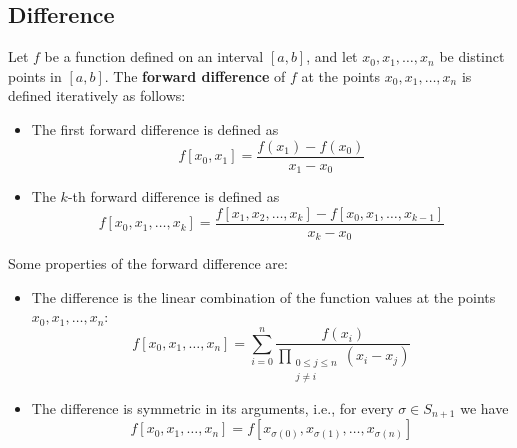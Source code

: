 \documentclass{matharticle}
\begin{document}
\subsection{Difference}
\begin{definition}
	Let $f$ be a function defined on an interval $[a, b]$, and let $x_0, x_1, \ldots, x_n$ be distinct points in $[a, b]$. The \textbf{forward difference} of $f$ at the points $x_0, x_1, \ldots, x_n$ is defined iteratively as follows:
	\begin{itemize}
		\item The first forward difference is defined as
		      \begin{equation}
			      f[x_0, x_1] = \frac{f(x_1) - f(x_0)}{x_1 - x_0}
		      \end{equation}
		\item The $k$-th forward difference is defined as
		      \begin{equation}
			      f[x_0, x_1, \ldots, x_k] = \frac{f[x_1, x_2, \ldots, x_k] - f[x_0, x_1, \ldots, x_{k-1}]}{x_k - x_0}
		      \end{equation}
	\end{itemize}
\end{definition}
Some properties of the forward difference are:
\begin{itemize}
	\item The difference is the linear combination of the function values at the points $x_0, x_1, \ldots, x_n$:
	      \begin{equation}
		      f[x_0, x_1, \ldots, x_n] = \sum_{i=0}^{n} \frac{f(x_i)}{\prod_{\substack{0 \leq j \leq n \\ j \neq i}} (x_i - x_j)}
	      \end{equation}
	\item The difference is symmetric in its arguments, i.e., for every $\sigma \in S_{n+1}$ we have
	      \begin{equation}
		      f[x_0, x_1, \ldots, x_n] = f[x_{\sigma(0)}, x_{\sigma(1)}, \ldots, x_{\sigma(n)}]
	      \end{equation}
\end{itemize}
\end{document}
